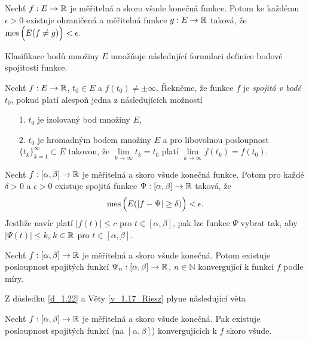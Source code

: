 \begin{theorem}
Nechť $f:E \to \mathbb{R}$ je měřitelná a skoro všude konečná funkce. Potom ke každému $\epsilon>0$ existuje ohraničená a měřitelná funkce $g:E \to \mathbb{R}$ taková, že $\operatorname{mes} \Big(E(f \neq g)\Big) < \epsilon.$\label{v_1.19}
\end{theorem}

Klasifikace bod\r u množiny $E$ umožňuje následující formulaci definice bodové spojitosti funkce.

\begin{definition}
Nechť $f:E \to \mathbb{R}$, $t_0 \in E$ a $f(t_0) \neq \pm \infty$. 
Řekněme, že funkce $f$ je \textit{spojitá v bodě $t_0$}, pokud platí alespoň jedna z následujících možností
\begin{enumerate}
\item[1.] $t_0$ je izolovaný bod množiny $E$,
\item[2.] $t_0$ je hromadným bodem množiny $E$ a pro libovolnou posloupnost $\{t_k\}_{k=1}^{\infty} \subset E$ takovou, že $\lim \limits _{k \to \infty} t_k = t_0$ platí $\lim \limits _{k \to \infty} f(t_k)=f(t_0)$.
\end{enumerate}
\end{definition}

\begin{theorem}[Borel]
\label{v_1.21_Borel}
Nechť $f:[\alpha,\beta] \to \mathbb{R}$ je měřitelná a skoro všude konečná funkce. 
Potom pro každé $\delta >0$ a $\epsilon >0$ existuje spojitá funkce $\Psi:[\alpha, \beta] \to \mathbb{R}$ taková, že 
\begin{align*}
\operatorname{mes} \Big(E(|f - \Psi|\geq \delta)\Big)< \epsilon.
\end{align*}
Jestliže navíc platí $|f(t)| \leq c$ pro $t \in [\alpha,\beta]$, pak lze funkce $\Psi$ vybrat tak, aby $|\Psi(t)|\leq k$, $k \in \mathbb{R}$ pro $t \in [\alpha, \beta]$.
\end{theorem}

\begin{dusledek}
Nechť $f:[\alpha, \beta] \to \mathbb{R}$ je měřitelná a skoro všude konečná. Potom existuje posloupnost spojitých funkcí $\Psi_n:[\alpha, \beta]\to \mathbb{R}$, $n \in \mathbb{N}$ konvergující k funkci $f$ podle míry.
\label{d_1.22}
\end{dusledek}
Z důsledku \ref{d_1.22} a Věty \ref{v_1.17_Riesz} plyne následující věta


\begin{theorem}[Frechét]
\label{v_1.23_Frechet}
Nechť $f:[\alpha, \beta] \to \mathbb{R}$ je měřitelná a skoro všude konečná. Pak existuje posloupnost spojitých funkcí (na $[\alpha, \beta]$) konvergujících k $f$ skoro všude.
\end{theorem}

